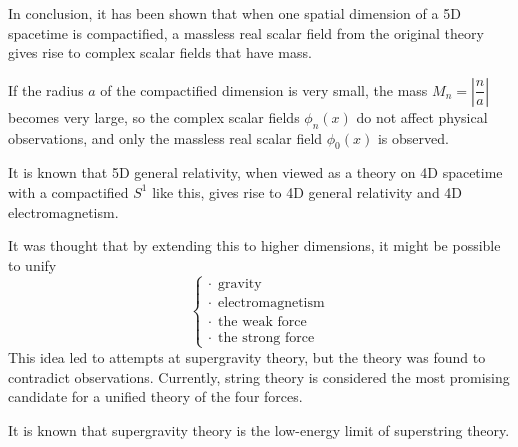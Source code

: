 \documentclass{article}
\begin{document}
In conclusion, it has been shown that when one spatial dimension of a 5D spacetime is compactified, a massless real scalar field from the original theory gives rise to complex scalar fields that have mass.

If the radius $a$ of the compactified dimension is very small,
the mass $M_{n} = \left| \dfrac{n}{a} \right|$ becomes very large,
so the complex scalar fields $\phi_{n}(x)$ do not affect physical observations,
and only the massless real scalar field $\phi_{0}(x)$ is observed.

It is known that 5D general relativity, when viewed as a theory on 4D spacetime with a compactified $S^{1}$ like this, gives rise to 4D general relativity and 4D electromagnetism.

It was thought that by extending this to higher dimensions, it might be possible to unify
\begin{equation*}
	\begin{cases}
		\cdot \ \ \text{gravity}          \\
		\cdot \ \ \text{electromagnetism} \\
		\cdot \ \ \text{the weak force}   \\
		\cdot \ \ \text{the strong force}
	\end{cases}
\end{equation*}
This idea led to attempts at supergravity theory, but the theory was found to contradict observations.
Currently, string theory is considered the most promising candidate for a unified theory of the four forces.

It is known that supergravity theory is the low-energy limit of superstring theory.
\end{document}
